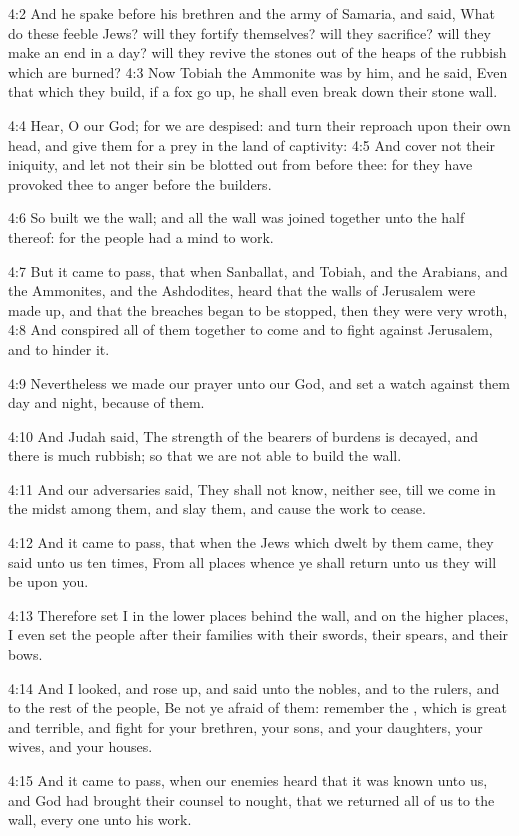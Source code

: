 4:2 And he spake before his brethren and the army of Samaria, and
said, What do these feeble Jews? will they fortify themselves? will
they sacrifice?  will they make an end in a day? will they revive the
stones out of the heaps of the rubbish which are burned?  4:3 Now
Tobiah the Ammonite was by him, and he said, Even that which they
build, if a fox go up, he shall even break down their stone wall.

4:4 Hear, O our God; for we are despised: and turn their reproach upon
their own head, and give them for a prey in the land of captivity: 4:5
And cover not their iniquity, and let not their sin be blotted out
from before thee: for they have provoked thee to anger before the
builders.

4:6 So built we the wall; and all the wall was joined together unto
the half thereof: for the people had a mind to work.

4:7 But it came to pass, that when Sanballat, and Tobiah, and the
Arabians, and the Ammonites, and the Ashdodites, heard that the walls
of Jerusalem were made up, and that the breaches began to be stopped,
then they were very wroth, 4:8 And conspired all of them together to
come and to fight against Jerusalem, and to hinder it.

4:9 Nevertheless we made our prayer unto our God, and set a watch
against them day and night, because of them.

4:10 And Judah said, The strength of the bearers of burdens is
decayed, and there is much rubbish; so that we are not able to build
the wall.

4:11 And our adversaries said, They shall not know, neither see, till
we come in the midst among them, and slay them, and cause the work to
cease.

4:12 And it came to pass, that when the Jews which dwelt by them came,
they said unto us ten times, From all places whence ye shall return
unto us they will be upon you.

4:13 Therefore set I in the lower places behind the wall, and on the
higher places, I even set the people after their families with their
swords, their spears, and their bows.

4:14 And I looked, and rose up, and said unto the nobles, and to the
rulers, and to the rest of the people, Be not ye afraid of them:
remember the \LORD, which is great and terrible, and fight for your
brethren, your sons, and your daughters, your wives, and your houses.

4:15 And it came to pass, when our enemies heard that it was known
unto us, and God had brought their counsel to nought, that we returned
all of us to the wall, every one unto his work.

